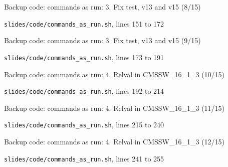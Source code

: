 \begin{frame}{Backup code: commands as run: 3. Fix test, v13 and v15 (8/15)}
  \vspace{0pt}\par
  {\tiny\color{lightgrey}\texttt{slides/code/commands\_as\_run.sh}, lines 151 to 172\par}
  
\end{frame}
\begin{frame}{Backup code: commands as run: 3. Fix test, v13 and v15 (9/15)}
  \vspace{0pt}\par
  {\tiny\color{lightgrey}\texttt{slides/code/commands\_as\_run.sh}, lines 173 to 191\par}
  
\end{frame}
\begin{frame}{Backup code: commands as run: 4. Relval in CMSSW\_16\_1\_3 (10/15)}
  \vspace{0pt}\par
  {\tiny\color{lightgrey}\texttt{slides/code/commands\_as\_run.sh}, lines 192 to 214\par}
  
\end{frame}
\begin{frame}{Backup code: commands as run: 4. Relval in CMSSW\_16\_1\_3 (11/15)}
  \vspace{0pt}\par
  {\tiny\color{lightgrey}\texttt{slides/code/commands\_as\_run.sh}, lines 215 to 240\par}
  
\end{frame}
\begin{frame}{Backup code: commands as run: 4. Relval in CMSSW\_16\_1\_3 (12/15)}
  \vspace{0pt}\par
  {\tiny\color{lightgrey}\texttt{slides/code/commands\_as\_run.sh}, lines 241 to 255\par}
  
\end{frame}
